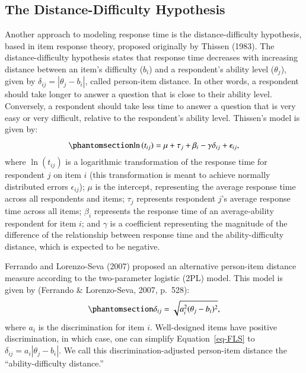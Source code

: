 \documentclass[
  number]{elsarticle}
\begin{document}
\subsection{The Distance-Difficulty
Hypothesis}\label{the-distance-difficulty-hypothesis}

Another approach to modeling response time is the distance-difficulty
hypothesis, based in item response theory, proposed originally by
Thissen (1983). The distance-difficulty hypothesis states that response
time decreases with increasing distance between an item's difficulty
(\(b_i\)) and a respondent's ability level (\(\theta_j\)), given by
\(\delta_{ij} = |\theta_j-b_i|\), called person-item distance. In other
words, a respondent should take longer to answer a question that is
close to their ability level. Conversely, a respondent should take less
time to answer a question that is very easy or very difficult, relative
to the respondent's ability level. Thissen's model is given by:
\begin{equation}\phantomsection\label{eq-DD}{\ln{(t_{ij})}=\mu+\tau_j+\beta_i-\gamma\delta_{ij}+\epsilon_{ij},}\end{equation}
where \(\ln{(t_{ij})}\) is a logarithmic transformation of the response
time for respondent \(j\) on item \(i\) (this transformation is meant to
achieve normally distributed errors \(\epsilon_{ij}\)); \(\mu\) is the
intercept, representing the average response time across all respondents
and items; \(\tau_j\) represents respondent \(j\)'s average response
time across all items; \(\beta_i\) represents the response time of an
average-ability respondent for item \(i\); and \(\gamma\) is a
coefficient representing the magnitude of the difference of the
relationship between response time and the ability-difficulty distance,
which is expected to be negative.

Ferrando and Lorenzo-Seva (2007) proposed an alternative person-item
distance measure according to the two-parameter logistic (2PL) model.
This model is given by (Ferrando \& Lorenzo-Seva, 2007, p.~528):
\begin{equation}\phantomsection\label{eq-FLS}{\delta_{ij} = \sqrt{a_i^2 (\theta_j - b_i)^2},}\end{equation}
where \(a_i\) is the discrimination for item \(i\). Well-designed items
have positive discrimination, in which case, one can simplify
Equation~\ref{eq-FLS} to \(\delta_{ij} = a_i|\theta_j-b_i|\). We call
this discrimination-adjusted person-item distance the
``ability-difficulty distance.''
\end{document}
